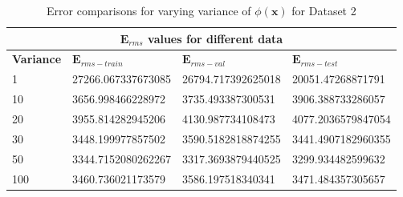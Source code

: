 {
\begin{table}[hptb]
\begin{tabular}{ |p{1.5cm}|p{3cm}|p{3cm}| p{3cm}|  }
\hline
\multicolumn{4}{|c|}{$\mathbf{E}_{rms}$ values for different data } \\
\hline
\rowcolor{lightgray} \textbf{Variance} & $\mathbf{E}_{rms-train}$ & $\mathbf{E}_{rms-val}$ & $\mathbf{E}_{rms-test}$ \\
\hline
  1   &   27266.067337673085     &       26794.717392625018       &     20051.47268871791   \\
 \hline
  10   &   3656.998466228972     &       3735.493387300531        &     3906.388733286057   \\   
 \hline
  20  &  3955.814282945206       &       4130.987734108473        &     4077.2036579847054        \\
 \hline
  30  &   3448.199977857502      &       3590.5182818874255       &     3441.4907182960355     \\
 \hline
  50  &   3344.7152080262267     &       3317.3693879440525       &     3299.934482599632     \\
 \hline
  100  &   3460.736021173579     &       3586.197518340341        &     3471.484357305657      \\
\hline
\end{tabular}
\caption{Error comparisons for varying variance of $\phi(\mathbf{x}) $ for Dataset 2}
\label{table:9}
\end{table}
}


